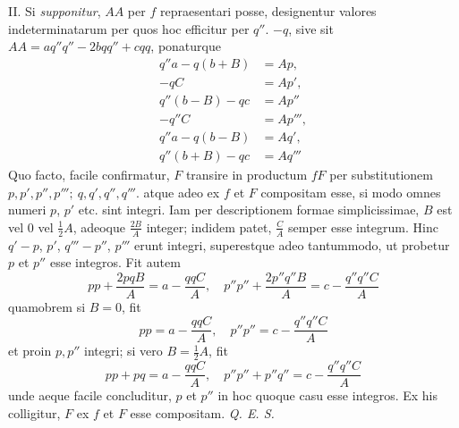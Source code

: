 II. Si \textit{supponitur}, \(AA\) per \(f\) repraesentari posse, designentur valores indeterminatarum per quos hoc efficitur per \(q''\). \(-q\), sive sit \(AA=aq''q''-2bqq''+cqq\), ponaturque
\[
\begin{aligned}
q''a-q(b+B)&=Ap,\\ -qC&=Ap',\\ q''(b-B)-qc&=Ap''\\ -q''C&=Ap''',\\ q''a-q(b-B)&=Aq',\\ q''(b+B)-qc&=Aq'''
\end{aligned}
\]
Quo facto, facile confirmatur, \(F\) transire in productum \(fF\) per substitutionem \(p,\allowbreak p',\allowbreak p'',\allowbreak p''';\allowbreak \ q,\allowbreak q',\allowbreak q'',\allowbreak q'''\). atque adeo ex \(f\) et \(F\) compositam esse, si modo omnes numeri \(p\), \(p'\) etc. sint integri. Iam per descriptionem formae simplicissimae, \(B\) est vel \(0\) vel \(\frac12 A\), adeoque \(\frac{2B}{A}\) integer; indidem patet, \(\frac{C}{A}\) semper esse integrum. Hinc \(q'-p\), \(p'\), \(q'''-p''\), \(p'''\) erunt integri, superestque adeo tantummodo, ut probetur \(p\) et \(p''\) esse integros. Fit autem
\[
pp+\frac{2pqB}{A}=a-\frac{qqC}{A},\quad p''p''+\frac{2p''q''B}{A}=c-\frac{q''q''C}{A}
\]
quamobrem si \(B=0\), fit
\[
pp=a-\frac{qqC}{A},\quad p''p''=c-\frac{q''q''C}{A}
\]
et proin \(p,p''\) integri; si vero \(B=\frac12 A\), fit
\[
pp+pq=a-\frac{qqC}{A},\quad p''p''+p''q''=c-\frac{q''q''C}{A}
\]
unde aeque facile concluditur, \(p\) et \(p''\) in hoc quoque casu esse integros. Ex his colligitur, \(F\) ex \(f\) et \(F\) esse compositam. \textit{Q. E. S.}


